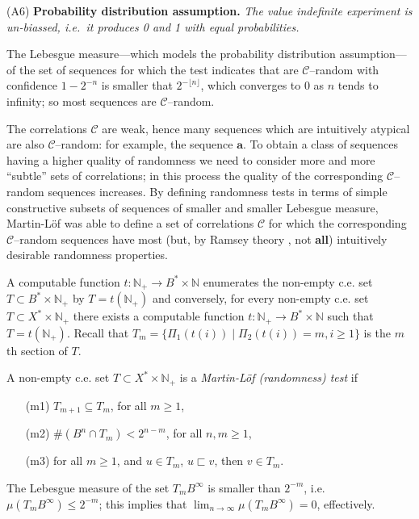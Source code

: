 \documentclass[%
 preprint,
 showpacs,
 showkeys,
 preprintnumbers,
  amsmath,amssymb,
  aps,
 pra,
  longbibliography,
  floatfix,
 ]{revtex4-1}
\theoremstyle{plain}
\newcommand{\N}{\mathbb{N}}%
\newcommand{\B}{B^*}%
\newcommand{\BI}{B^\infty}%
\newcommand{\ar}{\rightarrow}
\begin{document}
\hspace*{.4cm} (A6) {\bf Probability distribution assumption.} {\em The value indefinite experiment is un-biassed, i.e.\ it produces 0 and 1 with equal probabilities.}

\bigskip


 The Lebesgue measure---which models the probability distribution assumption---of the set of sequences for which the test indicates that are $\mathcal{C}$--random with confidence $1-2^{-n}$ is smaller that $2^{-\lfloor n \rfloor}$, which converges to 0 as $n$ tends to infinity; so most sequences are $\mathcal{C}$--random.

The correlations  $\mathcal{C}$ are weak, hence many sequences which are intuitively atypical are also $\mathcal{C}$--random: for example, the sequence ${\mathbf a}$.  To obtain a class of sequences having a higher quality of randomness we need to consider more and more ``subtle'' sets of correlations; in this process the quality of the corresponding $\mathcal{C}$--random sequences increases. By defining randomness tests in terms of simple constructive subsets of sequences of smaller and smaller Lebesgue measure, Martin-L\"of \cite{ML1966} was able to define a set of correlations $\mathcal{C}$ for which the corresponding $\mathcal{C}$--random sequences have most (but,  by Ramsey theory \cite{GS1990},  not {\bf all}) intuitively desirable randomness properties.

 \medskip



A
 computable function $t: \N_{+} \ar \B \times \N$  enumerates the non-empty c.e. set $T \subset \B \times \N_{+}$ by $T= t(\N_{+})$ and conversely, for every  non-empty c.e. set $T \subset X^{*} \times \N_{+}$ there exists a computable function $t: \N_{+} \ar \B \times \N$  such that $T= t(\N_{+})$. Recall that $T_{m} = \{
\Pi_1(t(i)) \mid \Pi_2(t(i))=m, i\ge 1\}$ is the $m$th section of $T$.
\fi

A non-empty c.e. set $T \subset X^{*} \times \N_{+}$  is a {\em Martin-L\"of (randomness) test} if
\begin{itemize}
\item[(m1)] $T_{m+1} \subseteq T_m$, for all $m\ge 1$,
\item[(m2)]  $\# (B^{n} \cap T_m) < 2^{n-m}$, for all $n,m\ge 1$,
\item[(m3)]  for all $m\ge 1$, and $u\in T_m$, $u \sqsubset v$, then $v\in T_m$.
\end{itemize}

The Lebesgue measure of the set $T_m \BI$ is smaller than $2^{-m}$, i.e.\ $\mu (T_m \BI) \le 2^{-m}$; this implies that $\lim_{n\ar \infty} \mu (T_m \BI)=0$, effectively.
\end{document}
